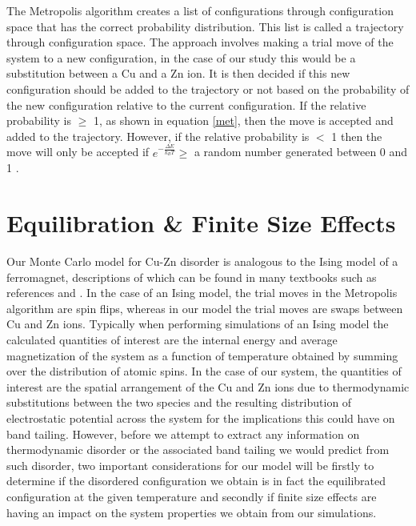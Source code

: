 The Metropolis algorithm creates a list of configurations through configuration space that has the correct probability distribution. This list is called a trajectory through configuration space. The approach involves making a trial move of the system to a new configuration, in the case of our study this would be a substitution between a Cu and a Zn ion. It is then decided if this new configuration should be added to the trajectory or not based on the probability of the new configuration relative to the current configuration. If the relative probability is  $\geq$ 1, as shown in equation \ref{met}, then the move is accepted and added to the trajectory. However, if the relative probability is $<$ 1 then the move will only be accepted if $e^{-\frac{\Delta E}{k_BT}} \ge$ a random number generated between 0 and 1 \cite{Lesar3}.


\section{Equilibration \& Finite Size Effects}\label{equilibration}
Our Monte Carlo model for Cu-Zn disorder is analogous to the Ising model of a ferromagnet, descriptions of which can be found in many textbooks such as references  and . In the case of an Ising model, the trial moves in the Metropolis algorithm are spin flips, whereas in our model the trial moves are swaps between Cu and Zn ions. Typically when performing simulations of an Ising model the calculated quantities of interest are the internal energy and average magnetization of the system as a function of temperature obtained by summing over the distribution of atomic spins. In the case of our system, the quantities of interest are the spatial arrangement of the Cu and Zn ions due to thermodynamic substitutions between the two species and the resulting distribution of electrostatic potential across the system for the implications this could have on band tailing.
However, before we attempt to extract any information on thermodynamic disorder or the associated band tailing we would predict from such disorder, two important considerations for our model will be firstly to determine if the disordered configuration we obtain is in fact the equilibrated configuration at the given temperature and secondly if finite size effects are having an impact on the system properties we obtain from our simulations.

